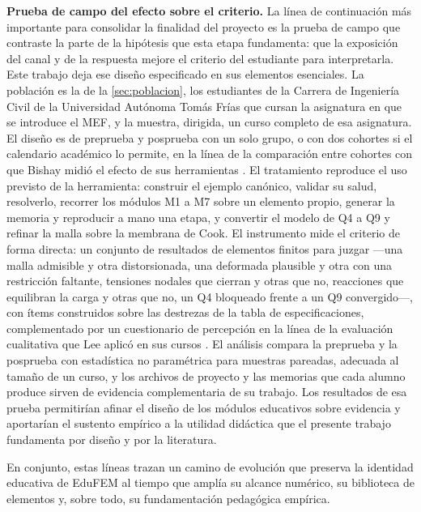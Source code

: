 \textbf{Prueba de campo del efecto sobre el criterio.} La línea de continuación más importante para consolidar la finalidad del proyecto es la prueba de campo que contraste la parte de la hipótesis que esta etapa fundamenta: que la exposición del canal y de la respuesta mejore el criterio del estudiante para interpretarla. Este trabajo deja ese diseño especificado en sus elementos esenciales. La población es la de la \autoref{sec:poblacion}, los estudiantes de la Carrera de Ingeniería Civil de la Universidad Autónoma Tomás Frías que cursan la asignatura en que se introduce el MEF, y la muestra, dirigida, un curso completo de esa asignatura. El diseño es de preprueba y posprueba con un solo grupo, o con dos cohortes si el calendario académico lo permite, en la línea de la comparación entre cohortes con que Bishay midió el efecto de sus herramientas \autocite[pp.~4-5, 13]{bishay2020teaching}. El tratamiento reproduce el uso previsto de la herramienta: construir el ejemplo canónico, validar su salud, resolverlo, recorrer los módulos M1 a M7 sobre un elemento propio, generar la memoria y reproducir a mano una etapa, y convertir el modelo de Q4 a Q9 y refinar la malla sobre la membrana de Cook. El instrumento mide el criterio de forma directa: un conjunto de resultados de elementos finitos para juzgar —una malla admisible y otra distorsionada, una deformada plausible y otra con una restricción faltante, tensiones nodales que cierran y otras que no, reacciones que equilibran la carga y otras que no, un Q4 bloqueado frente a un Q9 convergido—, con ítems construidos sobre las destrezas de la tabla de especificaciones, complementado por un cuestionario de percepción en la línea de la evaluación cualitativa que Lee aplicó en sus cursos \autocite[p.~168]{lee2015interactive}. El análisis compara la preprueba y la posprueba con estadística no paramétrica para muestras pareadas, adecuada al tamaño de un curso, y los archivos de proyecto y las memorias que cada alumno produce sirven de evidencia complementaria de su trabajo. Los resultados de esa prueba permitirían afinar el diseño de los módulos educativos sobre evidencia y aportarían el sustento empírico a la utilidad didáctica que el presente trabajo fundamenta por diseño y por la literatura.

En conjunto, estas líneas trazan un camino de evolución que preserva la identidad educativa de EduFEM al tiempo que amplía su alcance numérico, su biblioteca de elementos y, sobre todo, su fundamentación pedagógica empírica.
